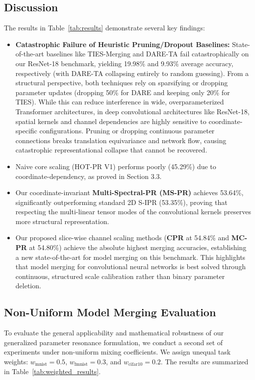 \documentclass{article}
\theoremstyle{plain}
\theoremstyle{definition}
\theoremstyle{remark}
\begin{document}
\subsection{Discussion}
The results in Table~\ref{tab:results} demonstrate several key findings:
\begin{itemize}
    \item \textbf{Catastrophic Failure of Heuristic Pruning/Dropout Baselines:} State-of-the-art baselines like TIES-Merging and DARE-TA fail catastrophically on our ResNet-18 benchmark, yielding 19.98\% and 9.93\% average accuracy, respectively (with DARE-TA collapsing entirely to random guessing). From a structural perspective, both techniques rely on sparsifying or dropping parameter updates (dropping 50\% for DARE and keeping only 20\% for TIES). While this can reduce interference in wide, overparameterized Transformer architectures, in deep convolutional architectures like ResNet-18, spatial kernels and channel dependencies are highly sensitive to coordinate-specific configurations. Pruning or dropping continuous parameter connections breaks translation equivariance and network flow, causing catastrophic representational collapse that cannot be recovered.
    \item Naive core scaling (HOT-PR V1) performs poorly (45.29\%) due to coordinate-dependency, as proved in Section 3.3.
    \item Our coordinate-invariant \textbf{Multi-Spectral-PR (MS-PR)} achieves 53.64\%, significantly outperforming standard 2D S-IPR (53.35\%), proving that respecting the multi-linear tensor modes of the convolutional kernels preserves more structural representation.
    \item Our proposed slice-wise channel scaling methods (\textbf{CPR} at 54.84\% and \textbf{MC-PR} at 54.80\%) achieve the absolute highest merging accuracies, establishing a new state-of-the-art for model merging on this benchmark. This highlights that model merging for convolutional neural networks is best solved through continuous, structured scale calibration rather than binary parameter deletion.
\end{itemize}

\subsection{Non-Uniform Model Merging Evaluation}
To evaluate the general applicability and mathematical robustness of our generalized parameter resonance formulation, we conduct a second set of experiments under non-uniform mixing coefficients. We assign unequal task weights: $w_{\text{mnist}} = 0.5$, $w_{\text{fmnist}} = 0.3$, and $w_{\text{cifar10}} = 0.2$. The results are summarized in Table~\ref{tab:weighted_results}.
\end{document}
